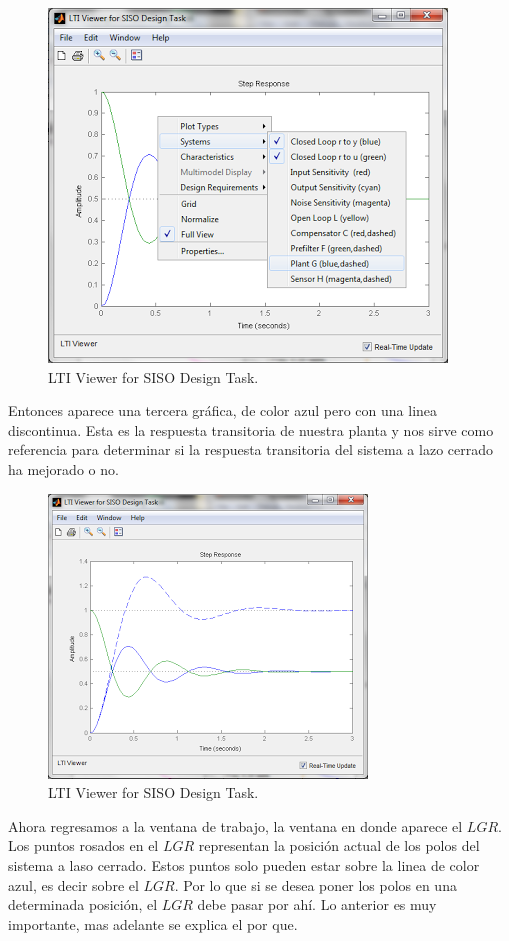 \documentclass[a4paper,12pt,twoside]{proyectotanquesecci}
\begin{document}
\begin{figure}[h]
\centering
\includegraphics[scale=0.6]{Ventana7}
\renewcommand{\figurename}{Fig.}
\caption{LTI Viewer for SISO Design Task.}
\label{LTI Viewer for SISO Design Task.}
\end{figure}

Entonces aparece una tercera gráfica, de color azul pero con una linea discontinua. Esta es la respuesta transitoria de nuestra planta y nos sirve como referencia para determinar si la respuesta transitoria del sistema a lazo cerrado ha mejorado o no. \\

\begin{figure}[h]
\centering
\includegraphics[scale=0.7]{Ventana8}
\renewcommand{\figurename}{Fig.}
\caption{LTI Viewer for SISO Design Task.}
\label{LTI Viewer for SISO Design Task.}
\end{figure}

Ahora regresamos a la ventana de trabajo, la ventana en donde aparece el $LGR$. Los puntos rosados en el $LGR$ representan la posición actual de los polos del sistema a laso cerrado. Estos puntos solo pueden estar sobre la linea de color azul, es decir sobre el $LGR$. Por lo que si se desea poner los polos en una determinada posición, el $LGR$ debe pasar por ahí. Lo anterior es muy importante, mas adelante se explica el por que. \\
\end{document}

